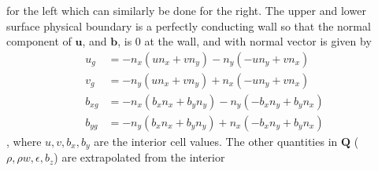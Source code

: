 \documentclass[paper=a4, fontsize=11pt]{scrartcl}
\numberwithin{equation}{section}                %
\numberwithin{figure}{section}                  %
\numberwithin{table}{section}                           %
\begin{document}
for the left which can similarly be done for the right. The upper and lower surface physical boundary is a perfectly conducting wall so that the normal component of $\mathbf{u}$, and $\mathbf{b}$, is $0$ at the wall, and with normal vector is given by
\begin{align*}
  u_g &= -n_x(u n_x + v n_y) - n_y(-u n_y + v n_x)\\
  v_g &= -n_y(u n_x + v n_y) + n_x(-u n_y + v n_x)\\
  b_{xg} &= -n_x(b_x n_x+b_y n_y) - n_y( -b_x n_y + b_y n_x)\\
  b_{yg} &= -n_y(b_x n_x + b_y n_y) + n_x(-b_x n_y + b_y n_x)
\end{align*}
, where $u,v,b_x,b_y$ are the interior cell values. The other quantities in $\mathbf{Q}$ ($\rho, \rho w, \epsilon, b_z$) are extrapolated from the interior


\clearpage
 
  
\end{document}

